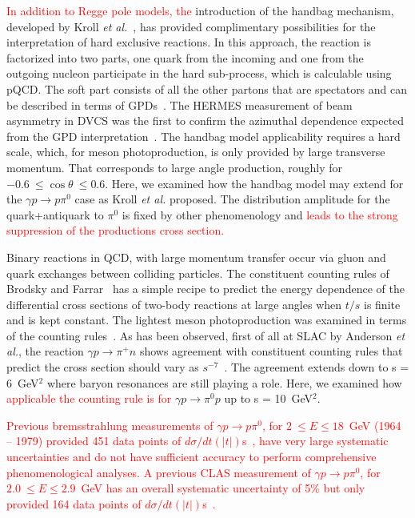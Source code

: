 \documentclass[aps,prc,twocolumn,floatfix,showpacs,preprintnumbers,amsmath,amssymb,superscriptaddress,linenumbers]{revtex4-1}
\begin{document}
 
\textcolor{red}{In addition to Regge pole models, the} introduction of the handbag mechanism, developed by 
Kroll \textit{et al.}~\cite{Huang:2000kd}, has provided complimentary 
possibilities for the interpretation of hard exclusive reactions. In 
this approach, the reaction is factorized into two parts, one quark 
from the incoming and one from the outgoing nucleon participate in the 
hard sub-process, which is calculable using pQCD. The soft part 
consists of all the other partons that are spectators and can be 
described in terms of GPDs~\cite{Ji:1996nm}.
The HERMES measurement of beam asymmetry in DVCS was the first 
to confirm the azimuthal dependence expected from the GPD interpretation~\cite{Amarian:2000vx}.
The handbag model applicability requires a hard scale, which, for meson 
photoproduction, is only provided by large transverse momentum. That 
corresponds to large angle production, roughly for 
$-0.6~\leq\cos\theta~\leq 0.6$.  Here, we examined how the handbag 
model may extend for the $\gamma p\rightarrow p\pi^0$ case as Kroll 
\textit{et al.} proposed. The distribution amplitude for the 
quark+antiquark to $\pi^0$ is fixed by other phenomenology and \textcolor{red}{ 
leads to the strong suppression of the productions cross section.}	



Binary reactions in QCD, with large momentum transfer 
occur via gluon and quark exchanges between colliding particles. The 
constituent counting rules of Brodsky and Farrar~\cite{Brodsky:1973kr} 
has a simple recipe to predict the energy dependence of the 
differential cross sections of two-body reactions at large angles 
when $t/s$ is finite and is kept constant.  The lightest meson 
photoproduction was examined in terms of the counting 
rules~\cite{Anderson:1976ph,Jenkins:1995bk,Zhu:2002su,Chen:2009sda,
Kong:2015yzn}. As has been observed, first of all at SLAC by 
Anderson \textit{et al.}, the reaction $\gamma p\rightarrow\pi^+n$ 
shows agreement with constituent counting rules that predict the 
cross section should vary as $s^{-7}$~\cite{Anderson:1976ph}. The 
agreement extends down to s = 6~GeV$^2$ where baryon resonances are 
still playing a role.  Here, we examined how \textcolor{red}{applicable the counting rule is 
for} $\gamma p\rightarrow\pi^0p$ up to s = 10~GeV$^2$. 

\textcolor{red}{Previous bremsstrahlung measurements of $\gamma p\rightarrow p\pi^0$, for $2~\leq E\leq 
18$~GeV (1964 -- 1979) provided 451 data points of $d\sigma/dt(|t|)$s~\cite{brem}, have very large systematic 
uncertainties and do not have sufficient accuracy to perform 
comprehensive phenomenological analyses.  A previous CLAS measurement of $\gamma p\rightarrow p\pi^0$, for $2.0~\leq E\leq 2.9$~GeV has an overall systematic uncertainty of 5\% but only provided 164 data points of $d\sigma/dt(|t|)$s~\cite{Dugger:2007bt}.}
\end{document}
